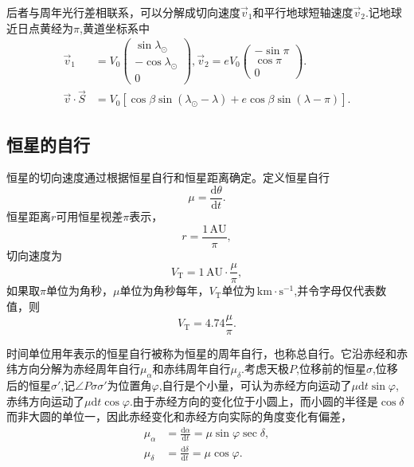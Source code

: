 \documentclass[11pt, a4paper, oneside]{ctexart}
\numberwithin{equation}{subsection}
\begin{document}
后者与周年光行差相联系，可以分解成切向速度$\vec v_1$和平行地球短轴速度$\vec v_2$.记地球近日点黄经为$\pi$,黄道坐标系中
\begin{align}
\vec v_1&=V_0\begin{pmatrix}
\sin\lambda_\odot\\
-\cos\lambda_\odot\\
0
\end{pmatrix},\vec v_2=eV_0\begin{pmatrix}
-\sin\pi\\
\cos\pi\\
0
\end{pmatrix}.\\
\vec v\cdot\vec S&=V_{0}\left[\cos\beta\sin\left(\lambda_\odot-\lambda\right)+e\cos\beta\sin\left(\lambda-\pi\right)\right].
\end{align}

\subsection{恒星的自行}
恒星的切向速度通过根据恒星自行和恒星距离确定。定义恒星自行
\begin{equation}
\mu=\frac{\mathrm{d}\theta}{\mathrm{d}t}.
\end{equation}
恒星距离$r$可用恒星视差$\pi$表示，
\begin{equation}
r=\frac{1\,\mathrm{AU}}{\pi},
\end{equation}
切向速度为
\begin{equation}
V_{\text{T}}=1\,\mathrm{AU}\cdot\frac{\mu}{\pi},
\end{equation}
如果取$\pi$单位为角秒，$\mu$单位为角秒每年，$V_\text{T}$单位为$\,\mathrm{km\cdot{}s^{-1}}$,并令字母仅代表数值，则
\begin{equation}
V_{\text{T}}=4.74\frac{\mu}{\pi}.
\end{equation}

时间单位用年表示的恒星自行被称为恒星的周年自行，也称总自行。它沿赤经和赤纬方向分解为赤经周年自行$\mu_\alpha$和赤纬周年自行$\mu_\delta$.考虑天极$P$,位移前的恒星$\sigma$,位移后的恒星$\sigma'$,记$\angle{P\sigma\sigma'}$为位置角$\varphi$,自行是个小量，可认为赤经方向运动了$\mu\mathrm{d}t\sin\varphi$,赤纬方向运动了$\mu\mathrm{d}t\cos\varphi$.由于赤经方向的变化位于小圆上，而小圆的半径是$\cos\delta{}$而非大圆的单位一，因此赤经变化和赤经方向实际的角度变化有偏差，
\begin{align}
\mu_{\alpha}&=\frac{\mathrm{d}\alpha}{\mathrm{d}t}=\mu\sin\varphi\sec\delta{},\label{6.1.4}\\
\mu_{\delta{}}&=\frac{\mathrm{d}\delta{}}{\mathrm{d}t}=\mu\cos\varphi.\label{6.1.5}
\end{align}
\end{document}

